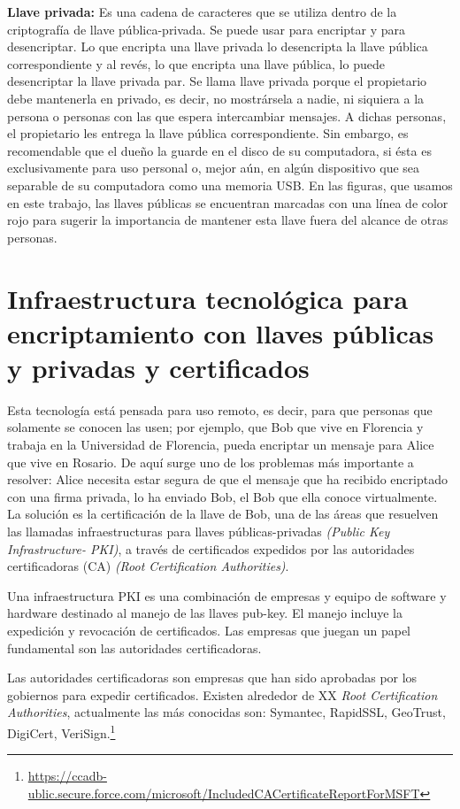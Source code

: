 \documentclass[12pt]{report} %
\begin{document}
\begin{itemize}
\textbf{Llave privada:} Es una cadena de caracteres que se utiliza dentro de la criptografía de llave pública-privada. Se puede usar para encriptar y para desencriptar. Lo que encripta una llave privada lo desencripta la llave pública correspondiente y al revés, lo que encripta una llave pública, lo puede desencriptar la llave privada par. Se llama llave privada porque el propietario debe mantenerla en privado, es decir, no mostrársela a nadie, ni siquiera a la persona o personas con las que espera intercambiar mensajes. A dichas personas, el propietario les entrega la llave pública correspondiente. Sin embargo, es recomendable que el dueño la guarde en el disco de su computadora, si ésta es exclusivamente para uso personal o, mejor aún, en algún dispositivo que sea separable de su computadora como una memoria USB. En las figuras, que usamos en este trabajo, las llaves públicas se encuentran marcadas con una línea de color rojo para sugerir la importancia de mantener esta llave fuera del alcance de otras personas.

\section{Infraestructura tecnológica para encriptamiento con llaves públicas y privadas y certificados}

Esta tecnología está pensada para uso remoto, es decir, para que personas que solamente se conocen las usen; por ejemplo, que Bob que vive en Florencia y trabaja en la Universidad de Florencia, pueda encriptar un mensaje para Alice que vive en Rosario. De aquí surge uno de los problemas más importante a resolver: Alice necesita estar segura de que el mensaje que ha recibido encriptado con una firma privada, lo ha enviado Bob, el Bob que ella conoce virtualmente. La solución es la certificación de la llave de Bob, una de las áreas que resuelven las llamadas infraestructuras para llaves públicas-privadas \textit{(Public Key Infrastructure- PKI)}, a través de certificados expedidos por las autoridades certificadoras (CA) \textit{(Root Certification Authorities)}.

Una infraestructura PKI  es una combinación de  empresas y equipo de software y hardware destinado al manejo de las llaves pub-key. El manejo incluye la expedición y revocación de certificados. Las empresas que juegan un papel fundamental son las autoridades certificadoras.

Las autoridades certificadoras son empresas que han sido aprobadas por los gobiernos para expedir certificados. Existen alrededor de XX \textit{Root Certification Authorities}, actualmente las más conocidas son: Symantec,  RapidSSL,  GeoTrust, DigiCert, VeriSign.\footnote{\url{https://ccadb-ublic.secure.force.com/microsoft/IncludedCACertificateReportForMSFT}}


\end{itemize}
\end{document}
